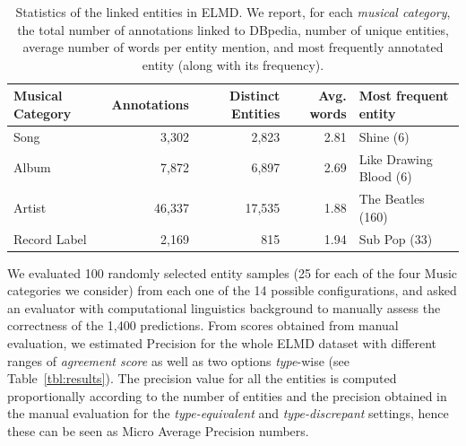 \begin{table}[ht!]
\small
\centering
\def\arraystretch{1.2}
	\begin{tabular}{|l|r|r|r|l|}
\hline
\textbf{Musical Category} & \textbf{Annotations} & \textbf{Distinct Entities} & \textbf{Avg. words} & \textbf{Most frequent entity} \\
\hline
Song & 3,302 & 2,823 & 2.81 & Shine (6) \\
Album & 7,872 & 6,897 & 2.69 & Like Drawing Blood (6) \\
Artist & 46,337 & 17,535 & 1.88 & The Beatles (160) \\
Record Label & 2,169 & 815 & 1.94 & Sub Pop (33) \\
\hline
	\end{tabular}
	\caption{Statistics of the linked entities in ELMD. We report, for each \textit{musical category}, the total number of annotations linked to DBpedia, number of unique entities, average number of words per entity mention, and most frequently annotated entity (along with its frequency).}
	\label{tbl:statistics}
\end{table}


We evaluated 100 randomly selected entity samples (25 for each of the four Music categories we consider) from each one of the 14 possible configurations, and asked an eva\-luator with computational linguistics background to manually assess the correctness of the 1,400 predictions. From scores obtained from manual evaluation, we estimated Precision for the whole \textsc{ELMD} dataset with different ranges of \textit{agreement score} as well as two options \textit{type}-wise (see Table~\ref{tbl:results}). The precision value for all the entities is computed proportionally according to the number of entities and the precision obtained in the manual evaluation for the \textit{type-equivalent} and \textit{type-discrepant} settings, hence these can be seen as Micro Average Precision numbers.

